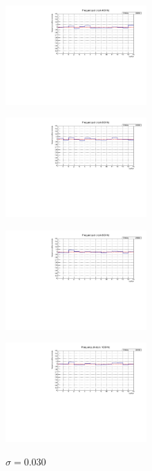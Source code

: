 \documentclass[journal]{IEEEtran}
\begin{document}
\begin{figure}[H]%
\begin{center}

\caption{$\sigma = 0.033$}
\includegraphics[width=0.48\textwidth]{analysis/output/dnl_1_400hz_bars.pdf}
\label{fig:graph_dnl_400_hz}
\caption{$\sigma = 0.031$}
\includegraphics[width=0.48\textwidth]{analysis/output/dnl_2_600hz_bars.pdf}
\label{fig:graph_dnl_600_hz}
\caption{$\sigma = 0.028$}
\includegraphics[width=0.48\textwidth]{analysis/output/dnl_3_800hz_bars.pdf}
\label{fig:graph_dnl_800_hz}
\caption{$\sigma = 0.030$}
\includegraphics[width=0.48\textwidth]{analysis/output/dnl_4_1000hz_bars.pdf}
\label{fig:graph_dnl_1000_hz}
\end{center}
\end{figure}
\end{document}
